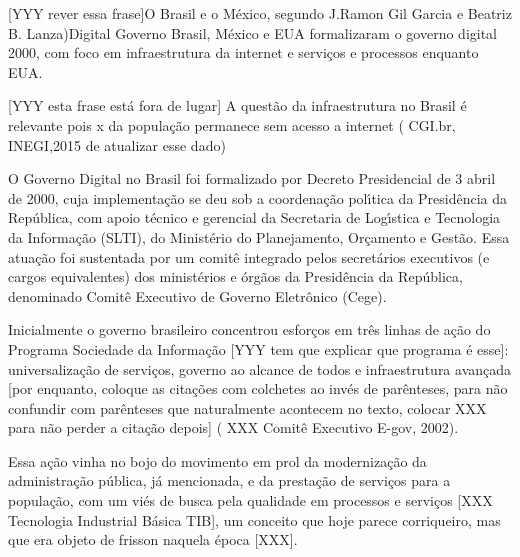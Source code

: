 \documentclass[
12pt,		%
openright,	%
twoside,  %
a4paper,			%
chapter=TITLE,		%
english,			%
french,				%
spanish,			%
brazil				%
]{USPSC-classe/USPSC_RedarTex}
\begin{document}
[YYY rever essa frase]O Brasil e o M\'exico, segundo J.Ramon Gil Garcia e Beatriz B. Lanza)Digital Governo Brasil, M\'exico e EUA formalizaram o governo digital 2000, com foco em infraestrutura da internet e servi\c{c}os e processos enquanto EUA.










[YYY esta frase est\'a fora de lugar] A quest\~ao da infraestrutura no Brasil \'e relevante pois x da popula\c{c}\~ao permanece sem acesso a internet ( CGI.br, INEGI,2015 de atualizar esse dado)










O Governo Digital no Brasil foi formalizado por Decreto Presidencial de 3 abril de 2000, cuja implementa\c{c}\~ao se deu sob a coordena\c{c}\~ao pol\'{\i}tica da Presid\^encia da Rep\'ublica, com apoio t\'ecnico e gerencial da Secretaria de Log\'{\i}stica e Tecnologia da Informa\c{c}\~ao (SLTI), do Minist\'erio do Planejamento, Or\c{c}amento e Gest\~ao. Essa atua\c{c}\~ao foi sustentada por um comit\^e integrado pelos secret\'arios executivos (e cargos equivalentes) dos minist\'erios e \'org\~aos da Presid\^encia da Rep\'ublica, denominado Comit\^e Executivo de Governo Eletr\^onico (Cege).










Inicialmente o governo brasileiro concentrou esfor\c{c}os em tr\^es linhas de a\c{c}\~ao do Programa Sociedade da Informa\c{c}\~ao [YYY tem que explicar que programa \'e esse]: universaliza\c{c}\~ao de servi\c{c}os, governo ao alcance de todos e infraestrutura avan\c{c}ada [por enquanto, coloque as cita\c{c}\~oes com colchetes ao inv\'es de par\^enteses, para n\~ao confundir com par\^enteses que naturalmente acontecem no texto, colocar XXX para n\~ao perder a cita\c{c}\~ao depois] ( XXX Comit\^e Executivo E-gov, 2002).










Essa a\c{c}\~ao vinha no bojo do movimento em prol da moderniza\c{c}\~ao da administra\c{c}\~ao p\'ublica, j\'a mencionada, e da presta\c{c}\~ao de servi\c{c}os para a popula\c{c}\~ao, com um vi\'es de busca pela \textquotedbl qualidade em processos e servi\c{c}os [XXX Tecnologia Industrial B\'asica TIB], um conceito que hoje parece corriqueiro, mas que era objeto de frisson naquela \'epoca [XXX].
\end{document}
